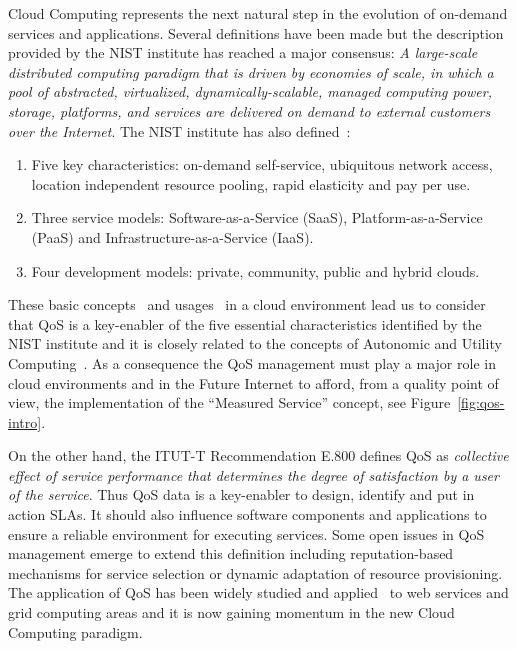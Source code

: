 Cloud Computing represents the next natural step in the evolution of on-demand services and applications. 
Several definitions have been made but the description~\cite{mell2011nist} provided by the NIST institute has reached a major consensus:  
\textit{A large-scale distributed computing paradigm that is driven by economies of scale, in which a pool of 
abstracted, virtualized, dynamically-scalable, managed computing power, storage, platforms, and services are delivered on demand to external customers over the Internet}. 
The NIST institute has also defined~\cite{mell2011nist,Garcia-Sanchez:2010:ASS:1852403.1852409}: 
\begin{enumerate}
 \item Five key characteristics: on-demand self-service, ubiquitous network access, location independent resource pooling, rapid elasticity and pay per use.
 \item Three service models: Software-as-a-Service (SaaS), Platform-as-a-Service (PaaS) and Infrastructure-as-a-Service (IaaS).
 \item Four development models: private, community, public and hybrid clouds. 
\end{enumerate}

These basic concepts~\cite{mell2011nist} and usages~\cite{cloud-usage} in a cloud environment lead us to consider that QoS is a key-enabler of the five essential characteristics identified by 
the NIST institute and it is closely related to the concepts of Autonomic and Utility Computing~\cite{Huebscher:2008:SAC:1380584.1380585}. 
As a consequence the QoS management must play a major role in cloud environments and in the Future Internet to 
afford, from a quality point of view, the implementation of the ``Measured Service'' concept, see Figure~\ref{fig:qos-intro}.

On the other hand, the ITUT-T Recommendation E.800 defines QoS as \textit{collective effect of service performance that determines the degree of 
satisfaction by a user of the service}. Thus QoS data is a key-enabler to design, identify and put in action SLAs. It should also influence 
software components and applications to ensure a reliable environment for executing services. Some open issues in 
QoS management emerge to extend this definition including reputation-based mechanisms for service selection or 
dynamic adaptation of resource provisioning. The application of QoS has been widely studied and 
applied~\cite{Conejero:2012:MSQ:2357487.2357591,Pedersen:2011:AMQ:2114495.2115542} to web services and grid computing areas and it is now 
gaining momentum in the new Cloud Computing paradigm. 

